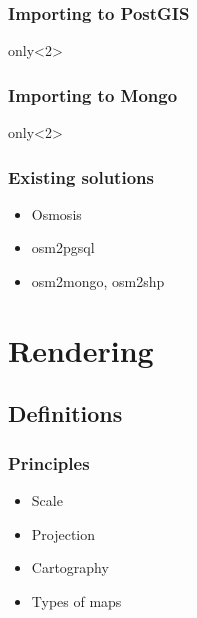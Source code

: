 \documentclass[14pt]{beamer}
\begin{document}
\begin{frame}
  \frametitle{Importing to PostGIS}
  only<2>{
    
  }
\end{frame}


\begin{frame}
  \frametitle{Importing to Mongo}
  only<2>{
    
  }
\end{frame}


\begin{frame}
  \frametitle{Existing solutions}
  \begin{itemize}
  \item Osmosis
  \item osm2pgsql
  \item osm2mongo, osm2shp
  \end{itemize}
\end{frame}


\section{Rendering}

\subsection{Definitions}
\label{sec:definitions-1}

\begin{frame}
  \frametitle{Principles}
  \begin{itemize}
  \item Scale
  \item Projection
  \item Cartography
  \item Types of maps
  \end{itemize}
\end{frame}
\end{document}
